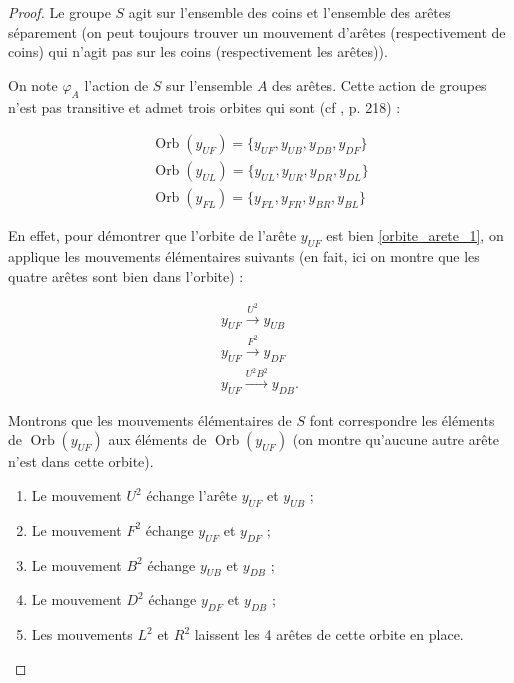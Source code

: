 \documentclass[french]{report}
\begin{document}
\begin{proof}
  Le groupe $S$ agit sur l'ensemble des coins et l'ensemble des arêtes séparement (on peut toujours trouver un mouvement d'arêtes (respectivement de coins) qui n'agit pas sur les coins (respectivement les arêtes)).


  On note $\varphi_A$ l'action de $S$ sur l'ensemble $A$ des arêtes. Cette action de groupes n'est pas transitive et admet trois orbites qui sont (cf \cite{math_rubik}, p. 218) :

  \begin{gather}
    \operatorname{Orb}(y _{UF}) = \{ y _{UF}, y _{UB}, y _{DB}, y _{DF} \} \label{orbite_arete_1}\\
    \operatorname{Orb}(y _{UL}) = \{ y _{UL}, y _{UR}, y _{DR}, y _{DL} \} \label{orbite_arete_2}\\
    \operatorname{Orb}(y _{FL}) = \{ y _{FL}, y _{FR}, y _{BR}, y _{BL} \} \label{orbite_arete_3}
  \end{gather}

  En effet, pour démontrer que l'orbite de l'arête $y _{UF}$ est bien \ref{orbite_arete_1}, on applique les mouvements élémentaires suivants (en fait, ici on montre que les quatre arêtes sont bien dans l'orbite) :

  \begin{gather*}
    y _{UF}  \stackrel{U ^2}{\longrightarrow} y _{UB} \\
    y _{UF}  \stackrel{F ^2}{\longrightarrow} y _{DF} \\
    y _{UF}  \stackrel{U ^2 B ^2}{\longrightarrow} y _{DB}.
  \end{gather*}

  Montrons que les mouvements élémentaires de $S$ font correspondre les éléments de $\operatorname{Orb}(y _{UF})$ aux éléments de $\operatorname{Orb}(y _{UF})$ (on montre qu'aucune autre arête n'est dans cette orbite).

  \begin{enumerate}
    \item Le mouvement $U ^2$ échange l'arête $y _{UF}$ et $y _{UB}$ ;
    \item Le mouvement $F ^2$ échange $y _{UF}$ et $y _{DF}$ ;
    \item Le mouvement $B ^2$ échange $ y _{UB}$ et $y _{DB}$ ;
    \item Le mouvement $D ^2$ échange $y _{DF}$ et $y _{DB}$ ;
    \item Les mouvements $L ^2$ et $R ^2$ laissent les 4 arêtes de cette orbite en place.
  \end{enumerate}


\end{proof}
\end{document}
